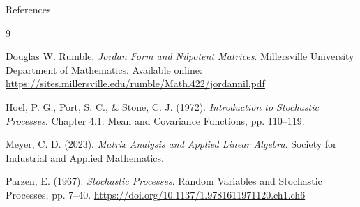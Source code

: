 \documentclass{beamer} %
\begin{document}
\begin{frame}{References}
\footnotesize
\begin{thebibliography}{9}

        Douglas W. Rumble.
        \newblock \emph{Jordan Form and Nilpotent Matrices}.
        \newblock Millersville University Department of Mathematics.
        \newblock Available online: \url{https://sites.millersville.edu/rumble/Math.422/jordannil.pdf}

Hoel, P. G., Port, S. C., \& Stone, C. J. (1972).
\newblock \emph{Introduction to Stochastic Processes}.
\newblock Chapter 4.1: Mean and Covariance Functions, pp. 110--119.

Meyer, C. D. (2023).
\newblock \emph{Matrix Analysis and Applied Linear Algebra}.
\newblock Society for Industrial and Applied Mathematics.

Parzen, E. (1967).
\newblock \emph{Stochastic Processes}.
\newblock Random Variables and Stochastic Processes, pp. 7--40.
\newblock \url{https://doi.org/10.1137/1.9781611971120.ch1.ch6}


\end{thebibliography}
\end{frame}


\end{document}
